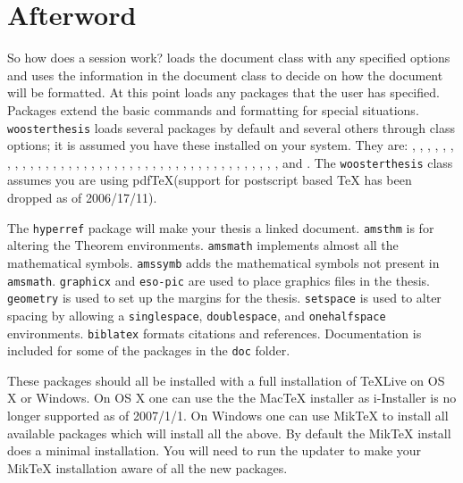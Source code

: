 \chapter*{Afterword}\label{after}
So how does a \lt session work? \lt loads the document class with any specified options and uses the information in the document class to decide on how the document will be formatted. At this point \lt loads any packages that the user has specified. Packages extend the basic \lt commands and formatting for special situations. \verb|woosterthesis| loads several packages by default and several others through class options; it is assumed you have these installed on your system. They are:
,
,
,
,
,
,
,
,
,
,
,
,
,
,
,
,
,
,
,
,
,
,
,
,
,
,
,
,
,
,
,
,
,
,
,
,
,
,
,
,
,
,
and .
The \texttt{woosterthesis} class assumes you are using pdf\TeX (support for postscript based TeX has been dropped as of 2006/17/11).

The \texttt{hyperref} package will make your thesis a linked document. \texttt{amsthm} is for altering the Theorem environments. \texttt{amsmath} implements almost all the mathematical symbols. \texttt{amssymb} adds the mathematical symbols not present in \texttt{amsmath}. \texttt{graphicx} and \texttt{eso-pic} are used to place graphics files in the thesis. \texttt{geometry} is used to set up the margins for the thesis. \texttt{setspace} is used to alter spacing by allowing a \texttt{singlespace}, \texttt{doublespace}, and \texttt{onehalfspace} environments. \texttt{biblatex} formats citations and references.  Documentation is included for some of the packages in the \verb|doc| folder.

These packages should all be installed with a full installation of TeXLive on OS X or Windows. On OS X one can use the the MacTeX installer as i-Installer is no longer supported as of 2007/1/1. On Windows one can use MikTeX to install all available packages which will install all the above. By default the MikTeX install does a minimal installation. You will need to run the updater to make your MikTeX installation aware of all the new packages.

